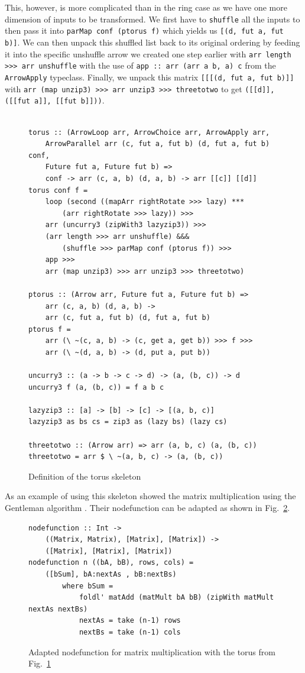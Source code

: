 \documentclass{jfp1}
\newcommand{\inlinecode}[1]{\texttt{#1}}
\begin{document}
\\\\
This, however, is more complicated than in the ring case as we have one more dimension of inputs to be transformed. We first have to \inlinecode{shuffle} all the inputs to then pass it into \inlinecode{parMap conf (ptorus f)} which yields us \inlinecode{[(d, fut a, fut b)]}. We can then unpack this shuffled list back to its original ordering by feeding it into the specific unshuffle arrow we created one step earlier with \inlinecode{arr length >>> arr unshuffle} with the use of \inlinecode{app :: arr (arr a b, a) c} from the \inlinecode{ArrowApply} typeclass. Finally, we unpack this matrix \inlinecode{[[[(d, fut a, fut b)]]} with \inlinecode{arr (map unzip3) >>> arr unzip3 >>> threetotwo} to get  \inlinecode{([[d]], ([[fut a]], [[fut b]]))}.
\\\\
\begin{figure}[h]
\begin{lstlisting}[frame=htrbl]
torus :: (ArrowLoop arr, ArrowChoice arr, ArrowApply arr,
	ArrowParallel arr (c, fut a, fut b) (d, fut a, fut b) conf,
	Future fut a, Future fut b) =>
	conf -> arr (c, a, b) (d, a, b) -> arr [[c]] [[d]]
torus conf f =
	loop (second ((mapArr rightRotate >>> lazy) ***
		(arr rightRotate >>> lazy)) >>>
	arr (uncurry3 (zipWith3 lazyzip3)) >>>
	(arr length >>> arr unshuffle) &&&
		(shuffle >>> parMap conf (ptorus f)) >>>
	app >>>
	arr (map unzip3) >>> arr unzip3 >>> threetotwo)

ptorus :: (Arrow arr, Future fut a, Future fut b) =>
	arr (c, a, b) (d, a, b) ->
	arr (c, fut a, fut b) (d, fut a, fut b)
ptorus f =
	arr (\ ~(c, a, b) -> (c, get a, get b)) >>> f >>>
	arr (\ ~(d, a, b) -> (d, put a, put b))

uncurry3 :: (a -> b -> c -> d) -> (a, (b, c)) -> d
uncurry3 f (a, (b, c)) = f a b c

lazyzip3 :: [a] -> [b] -> [c] -> [(a, b, c)]
lazyzip3 as bs cs = zip3 as (lazy bs) (lazy cs)

threetotwo :: (Arrow arr) => arr (a, b, c) (a, (b, c))
threetotwo = arr $ \ ~(a, b, c) -> (a, (b, c))
\end{lstlisting}
\caption{Definition of the torus skeleton}
\label{fig:torus}
\end{figure}
As an example of using this skeleton \citep{Loogen2012} showed the matrix multiplication using the Gentleman algorithm \citep{Gentleman1978}. Their nodefunction can be adapted as shown in Fig.~\ref{fig:torusMatMult}.
\begin{figure}[h]
\begin{lstlisting}[frame=htrbl]
nodefunction :: Int ->
	((Matrix, Matrix), [Matrix], [Matrix]) ->
	([Matrix], [Matrix], [Matrix])
nodefunction n ((bA, bB), rows, cols) =
	([bSum], bA:nextAs , bB:nextBs)
		where bSum =
			foldl' matAdd (matMult bA bB) (zipWith matMult nextAs nextBs)
			nextAs = take (n-1) rows
			nextBs = take (n-1) cols
\end{lstlisting}
\caption{Adapted nodefunction for matrix multiplication with the torus from Fig.~\ref{fig:torus}}
\label{fig:torusMatMult}
\end{figure}
\end{document}
